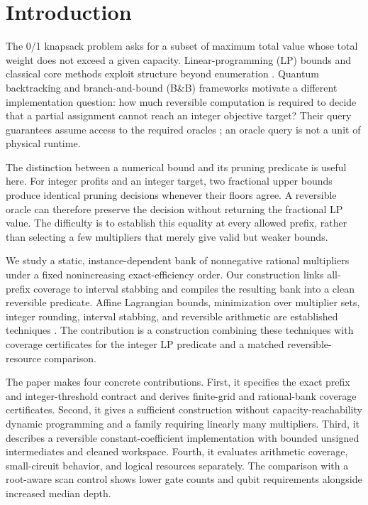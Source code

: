 \documentclass[referee,pdflatex,sn-mathphys-num]{sn-jnl}
\theoremstyle{thmstyleone}
\theoremstyle{thmstyletwo}
\begin{document}
\section{Introduction}\label{sec:intro}
The 0/1 knapsack problem asks for a subset of maximum total value whose total weight does not exceed a given capacity. Linear-programming (LP) bounds and classical core methods exploit structure beyond enumeration \cite{ref1,ref3,balas1980core}. Quantum backtracking and branch-and-bound (B\&B) frameworks motivate a different implementation question: how much reversible computation is required to decide that a partial assignment cannot reach an integer objective target? Their query guarantees assume access to the required oracles \cite{ref35,ref24}; an oracle query is not a unit of physical runtime.

The distinction between a numerical bound and its pruning predicate is useful here. For integer profits and an integer target, two fractional upper bounds produce identical pruning decisions whenever their floors agree. A reversible oracle can therefore preserve the decision without returning the fractional LP value. The difficulty is to establish this equality at every allowed prefix, rather than selecting a few multipliers that merely give valid but weaker bounds.

We study a static, instance-dependent bank of nonnegative rational multipliers under a fixed nonincreasing exact-efficiency order. Our construction links all-prefix coverage to interval stabbing and compiles the resulting bank into a clean reversible predicate. Affine Lagrangian bounds, minimization over multiplier sets, integer rounding, interval stabbing, and reversible arithmetic are established techniques \cite{bozejko2026,erickson2019algorithms,vedral1996,draper2000}. The contribution is a construction combining these techniques with coverage certificates for the integer LP predicate and a matched reversible-resource comparison.

The paper makes four concrete contributions. First, it specifies the exact prefix and integer-threshold contract and derives finite-grid and rational-bank coverage certificates. Second, it gives a sufficient construction without capacity-reachability dynamic programming and a family requiring linearly many multipliers. Third, it describes a reversible constant-coefficient implementation with bounded unsigned intermediates and cleaned workspace. Fourth, it evaluates arithmetic coverage, small-circuit behavior, and logical resources separately. The comparison with a root-aware scan control shows lower gate counts and qubit requirements alongside increased median depth.
\end{document}
